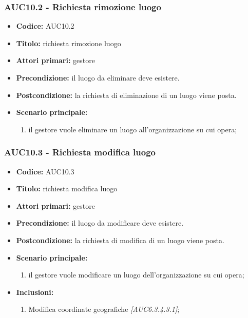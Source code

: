 \documentclass[casi-duso]{subfiles}
\begin{document}
\subsubsection{AUC10.2 - Richiesta rimozione luogo}%
\label{subsub:AUC10.2}
\begin{itemize}
  \item \textbf{Codice:} AUC10.2
  \item \textbf{Titolo:} richiesta rimozione luogo
  \item \textbf{Attori primari:} gestore
  \item \textbf{Precondizione:} il luogo da eliminare deve esistere.
  \item \textbf{Postcondizione:} la richiesta di eliminazione di un luogo viene posta.
  \item \textbf{Scenario principale:}
  \begin{enumerate}
    \item il gestore vuole eliminare un luogo all'organizzazione su cui opera;
  \end{enumerate}
\end{itemize}

\subsubsection{AUC10.3 - Richiesta modifica luogo}%
\label{subsub:AUC10.3}
\begin{itemize}
  \item \textbf{Codice:} AUC10.3
  \item \textbf{Titolo:} richiesta modifica luogo
  \item \textbf{Attori primari:} gestore
  \item \textbf{Precondizione:} il luogo da modificare deve esistere.
  \item \textbf{Postcondizione:} la richiesta di modifica di un luogo viene posta.
  \item \textbf{Scenario principale:}
  \begin{enumerate}
    \item il gestore vuole modificare un luogo dell'organizzazione su cui opera;
  \end{enumerate}
  \item \textbf{Inclusioni:}
  \begin{enumerate}
    \item Modifica coordinate geografiche \emph{[AUC6.3.4.3.1]};
  \end{enumerate}
\end{itemize}
\end{document}
